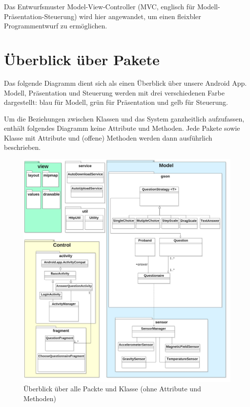 \documentclass[a4paper]{scrreprt}
\begin{document}
{        Das Entwurfsmuster Model-View-Controller (MVC, englisch für Modell-Präsentation-Steuerung) wird hier angewandet, um einen fleixbler Programmentwurf zu ermöglichen.


        \vspace*{0.5cm}
        \section{Überblick über Pakete}

            Das folgende Diagramm dient sich als einen Überblick über unsere Android App. Modell, Präsentation und Steuerung werden mit drei verschiedenen Farbe dargestellt: blau für Modell, grün für Präsentation und gelb für Steuerung.

            \noindent Um die Beziehungen zwischen Klassen und das System ganzheitlich aufzufassen, enthält folgendes Diagramm keine Attribute und Methoden. Jede Pakete sowie Klasse mit Attribute und (offene) Methoden werden dann ausführlich beschrieben.



            \newpage
            \vspace*{1cm}
            \begin{figure}[H]
                \centering
                \includegraphics[scale = 0.25]{packageDiagram.jpg}
                \caption{Überblick über alle Packte und Klasse (ohne Attribute und Methoden)}
            \end{figure}




}
\end{document}
